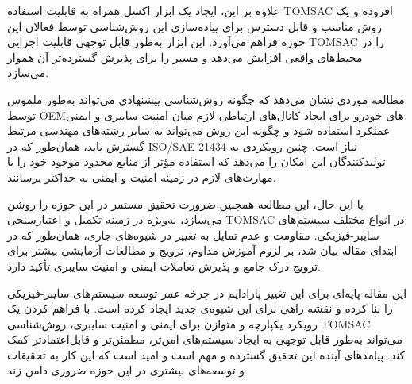 \documentclass[a4paper,10pt]{article}
\begin{document}
        علاوه بر این، ایجاد یک ابزار اکسل همراه به قابلیت استفاده TOMSAC افزوده و یک روش مناسب و قابل دسترس برای پیاده‌سازی این روش‌شناسی توسط فعالان این حوزه فراهم می‌آورد. این ابزار به‌طور قابل توجهی قابلیت اجرایی TOMSAC را در محیط‌های واقعی افزایش می‌دهد و مسیر را برای پذیرش گسترده‌تر آن هموار می‌سازد.
    
        مطالعه موردی نشان می‌دهد که چگونه روش‌شناسی پیشنهادی می‌تواند به‌طور ملموس توسط OEMهای خودرو برای ایجاد کانال‌های ارتباطی لازم میان امنیت سایبری و ایمنی عملکرد استفاده شود و چگونه این روش می‌تواند به سایر رشته‌های مهندسی مرتبط گسترش یابد، همان‌طور که در ISO/SAE 21434 نیاز است. چنین رویکردی به تولیدکنندگان این امکان را می‌دهد که استفاده مؤثر از منابع محدود موجود خود را با مهارت‌های لازم در زمینه امنیت و ایمنی به حداکثر برسانند.
    
        با این حال، این مطالعه همچنین ضرورت تحقیق مستمر در این حوزه را روشن می‌سازد، به‌ویژه در زمینه تکمیل و اعتبارسنجی TOMSAC در انواع مختلف سیستم‌های سایبر-فیزیکی. مقاومت و عدم تمایل به تغییر در شیوه‌های جاری، همان‌طور که در ابتدای مقاله بیان شد، بر لزوم آموزش مداوم، ترویج و مطالعات آزمایشی بیشتر برای ترویج درک جامع و پذیرش تعاملات ایمنی و امنیت سایبری تأکید دارد.
    
        این مقاله پایه‌ای برای این تغییر پارادایم در چرخه عمر توسعه سیستم‌های سایبر-فیزیکی را بنا کرده و نقشه راهی برای این شیوه‌ی جدید ایجاد کرده است. با فراهم کردن یک رویکرد یکپارچه و متوازن برای ایمنی و امنیت سایبری، روش‌شناسی TOMSAC می‌تواند به‌طور قابل توجهی به ایجاد سیستم‌های امن‌تر، مطمئن‌تر و قابل‌اعتمادتر کمک کند. پیامدهای آینده این تحقیق گسترده و مهم است و امید است که این کار به تحقیقات و توسعه‌های بیشتری در این حوزه ضروری دامن زند.
\end{document}
